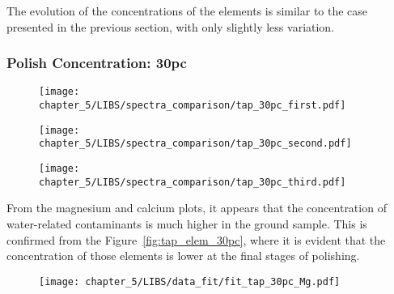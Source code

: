  The evolution of the concentrations of the elements is similar to the case presented in the previous section, with only slightly less variation.





 \subsubsection{Polish Concentration: 30pc}
 \label{subsubsec:30pc}
 \vspace*{-25pt}
 \begin{figure}[H]
     \centering
     \texttt{[image: chapter\_5/LIBS/spectra\_comparison/tap\_30pc\_first.pdf]} 
  \end{figure}
 
 \vspace*{-68pt}
 \begin{figure}[H]
     \centering
     \texttt{[image: chapter\_5/LIBS/spectra\_comparison/tap\_30pc\_second.pdf]} 
  \end{figure}
 
 \vspace*{-68pt}
 \begin{figure}[H]
     \centering
     \texttt{[image: chapter\_5/LIBS/spectra\_comparison/tap\_30pc\_third.pdf]} 
  \end{figure}
 
From the magnesium and calcium plots, it appears that the concentration of water-related contaminants is much higher in the ground sample. This is confirmed from the Figure~\ref{fig:tap_elem_30pc}, where it is evident that the concentration of those elements is lower at the final stages of polishing.

 \begin{figure}[H]
     \centering
     \texttt{[image: chapter\_5/LIBS/data\_fit/fit\_tap\_30pc\_Mg.pdf]} 
  \end{figure}
 
